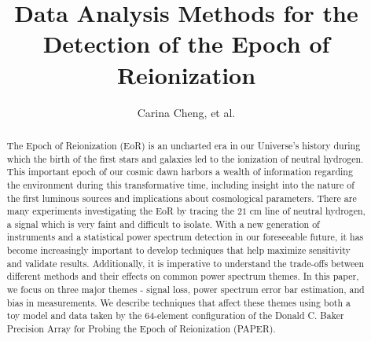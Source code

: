 \documentclass[preprint2,numberedappendix,tighten,twocolappendix]{aastex6}  %
\begin{document}
\title{Data Analysis Methods for the Detection of the Epoch of Reionization}

\author{
Carina Cheng,
et al.
}


	






\begin{abstract}
The Epoch of Reionization (EoR) is an uncharted era in our Universe's history during which the birth of the first stars and galaxies led to the ionization of neutral hydrogen. This important epoch of our cosmic dawn harbors a wealth of information regarding the environment during this transformative time, including insight into the nature of the first luminous sources and implications about cosmological parameters. There are many experiments investigating the EoR by tracing the $21$ cm line of neutral hydrogen, a signal which is very faint and difficult to isolate. With a new generation of instruments and a statistical power spectrum detection in our foreseeable future, it has become increasingly important to develop techniques that help maximize sensitivity and validate results. Additionally, it is imperative to understand the trade-offs between different methods and their effects on common power spectrum themes. In this paper, we focus on three major themes - signal loss, power spectrum error bar estimation, and bias in measurements. We describe techniques that affect these themes using both a toy model and data taken by the 64-element configuration of the Donald C. Baker Precision Array for Probing the Epoch of Reionization (PAPER).
\end{abstract}
\end{document}
